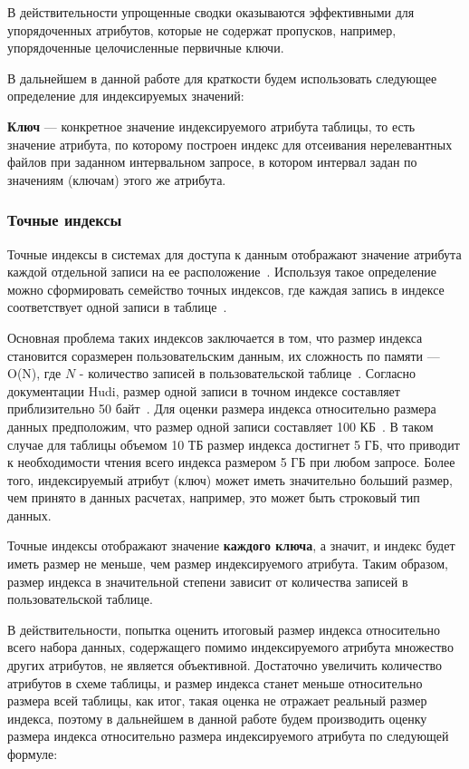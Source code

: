 В действительности упрощенные сводки оказываются эффективными для упорядоченных атрибутов, которые не содержат пропусков, например, упорядоченные целочисленные первичные ключи.

В дальнейшем в данной работе для краткости будем использовать следующее определение для индексируемых значений:
\begin{definition}\label{def:key}
    \textbf{Ключ} --- конкретное значение индексируемого атрибута таблицы, то есть значение атрибута, по которому построен индекс для отсеивания нерелевантных файлов при заданном интервальном запросе, в котором интервал задан по значениям (ключам) этого же атрибута.
\end{definition}


\subsubsection{Точные индексы} 

Точные индексы в системах для доступа к данным отображают значение атрибута каждой отдельной записи на ее расположение~\cite{Hudi_RLI}. Используя такое определение можно сформировать семейство точных индексов, где каждая запись в индексе соответствует одной записи в таблице~\cite{Tree_Data_Structures_and_Efficient_Indexing_Techniques}.

Основная проблема таких индексов заключается в том, что размер индекса становится соразмерен пользовательским данным, их сложность по памяти --- O(N), где $N$ - количество записей в пользовательской таблице~\cite{Tree_Data_Structures_and_Efficient_Indexing_Techniques}. Согласно документации Hudi, размер одной записи в точном индексе составляет приблизительно 50 байт~\cite{Hudi_RLI}. Для оценки размера индекса относительно размера данных предположим, что размер одной записи составляет 100 КБ~\cite{Hudi_RLI}. В таком случае для таблицы объемом 10 ТБ размер индекса достигнет 5 ГБ, что приводит к необходимости чтения всего индекса размером 5 ГБ при любом запросе. Более того, индексируемый атрибут (ключ) может иметь значительно больший размер, чем принято в данных расчетах, например, это может быть строковый тип данных.

Точные индексы отображают значение \textbf{каждого ключа}, а значит, и индекс будет иметь размер не меньше, чем размер индексируемого атрибута. Таким образом, размер индекса в значительной степени зависит от количества записей в пользовательской таблице.

В действительности, попытка оценить итоговый размер индекса относительно всего набора данных, содержащего помимо индексируемого атрибута множество других атрибутов, не является объективной. Достаточно увеличить количество атрибутов в схеме таблицы, и размер индекса станет меньше относительно размера всей таблицы, как итог, такая оценка не отражает реальный размер индекса, поэтому в дальнейшем в данной работе будем производить оценку размера индекса относительно размера индексируемого атрибута по следующей формуле:

